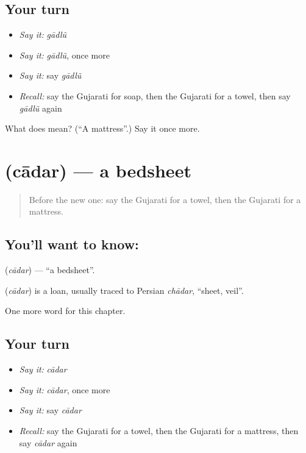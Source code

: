 \subsection*{Your turn}
\begin{itemize}
\raggedright
  \item \emph{Say it:} \emph{gādlũ}
  \item \emph{Say it:} \emph{gādlũ}, once more
  \item \emph{Say it:} say \emph{gādlũ}
  \item \emph{Recall:} say the Gujarati for soap, then the Gujarati for a towel, then say \emph{gādlũ} again
\end{itemize}

\begin{tcolorbox}[breakable,colback=teal!4,colframe=teal!35!black,title={Before you move on}]
What does  mean? (\textquotedblleft{}A mattress\textquotedblright{}.) Say it once more.
\end{tcolorbox}
\section[\texorpdfstring{\gu{ચાદર} (cādar)}{ચાદર (cādar)}]{ (cādar) — a bedsheet}

\label{lesson:GU-C107-cadar}



\begin{quote}
Before the new one: say the Gujarati for a towel, then the Gujarati for a mattress.
\end{quote}

\subsection*{You'll want to know: }
\textbf{} (\emph{cādar}) — \textquotedblleft{}a bedsheet\textquotedblright{}.

\begin{cousinweb}
\textbf{} (\emph{cādar}) is a loan, usually traced to Persian \emph{chādar}, \textquotedblleft{}sheet, veil\textquotedblright{}.
\end{cousinweb}

\begin{grammarlens}[title={What you've built}]
One more word for this chapter.
\end{grammarlens}

\subsection*{Your turn}
\begin{itemize}
\raggedright
  \item \emph{Say it:} \emph{cādar}
  \item \emph{Say it:} \emph{cādar}, once more
  \item \emph{Say it:} say \emph{cādar}
  \item \emph{Recall:} say the Gujarati for a towel, then the Gujarati for a mattress, then say \emph{cādar} again
\end{itemize}

